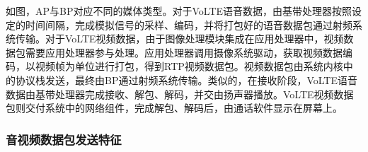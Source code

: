 
如图，AP与BP对应不同的媒体类型。对于VoLTE语音数据，由基带处理器按照设定的时间间隔，完成模拟信号的采样、编码，并将打包好的语音数据包通过射频系统传输。对于VoLTE视频数据，由于图像处理模块集成在应用处理器中，视频数据包需要应用处理器参与处理。应用处理器调用摄像系统驱动，获取视频数据编码，以视频帧为单位进行打包，得到RTP视频数据包。视频数据包由系统内核中的协议栈发送，最终由BP通过射频系统传输。类似的，在接收阶段，VoLTE语音数据由基带处理器完成接收、解包、解码，并交由扬声器播放。VoLTE视频数据包则交付系统中的网络组件，完成解包、解码后，由通话软件显示在屏幕上。

\subsubsection{音视频数据包发送特征}
\label{chap:backinfo:volte:packets:send}


